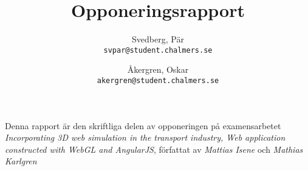 \documentclass[a4paper, 11pt]{article}
\author{
    Svedberg, Pär \\ \texttt{svpar@student.chalmers.se}
    \and
    Åkergren, Oskar \\ \texttt{akergren@student.chalmers.se}
}
\title{\vspace{-3cm}Opponeringsrapport}
\begin{document}
\maketitle
\vspace{-0.5cm}Denna rapport är den skriftliga delen av opponeringen på examensarbetet \emph{Incorporating 3D web simulation in the transport industry, Web application constructed with WebGL and AngularJS}, författat av \emph{Mattias Isene} och \emph{Mathias Karlgren}

\end{document}
